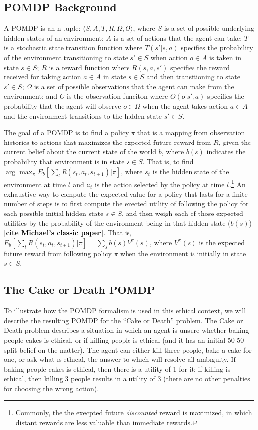 \documentclass[11pt]{article}
\newcommand\ncitea[1]{\textcolor{black}{{\bf [cite #1]}}}
\begin{document}
\subsection{POMDP Background}
A POMDP is an n tuple: $\langle S,A,T,R,\Omega,O \rangle$, where $S$ is a set of possible underlying hidden states of an environment; $A$ is a set of actions that the agent can take; $T$ is a stochastic state transition function where $T(s' | s, a)$ specifies the probability of the environment transitioning to state $s' \in S$ when action $a \in A$ is taken in state $s \in S$; $R$ is a reward function where $R(s, a, s')$ specifies the reward received for taking action $a \in A$ in state $s \in S$ and then transitioning to state $s' \in S$; $\Omega$ is a set of possible observations that the agent can make from the environment; and $O$ is the observation funciton where $O(o | s', a)$ specifies the probability that the agent will observe $o \in \Omega$ when the agent takes action $a \in A$ and the environment transitions to the hidden state $s' \in S$.

The goal of a POMDP is to find a policy $\pi$ that is a mapping from observation histories to actions that maximizes the expected future reward from $R$, given the current belief about the current state of the world $b$, where $b(s)$ indicates the probability that environment is in state $s \in S$. That is, to find $\arg\max_\pi E_b[\sum_t R(s_t,a_t,s_{t+1}) | \pi]$, where $s_t$ is the hidden state of the environment at time $t$ and $a_t$ is the action selected by the policy at time $t$.\footnote{Commonly, the the execpted future {\em discounted} reward is maximized, in which distant rewards are less valuable than immediate rewards.} An exhaustive way to compute the expected value for a policy that lasts for a finite number of steps is to first compute the exected utility of following the policy for each possible initial hidden state $s \in S$, and then weigh each of those expected utilities by the probability of the environment being in that hidden state ($b(s)$) \ncitea{Michael's classic paper}. That is, $E_b[\sum_t R(s_t,a_t,s_{t+1}) | \pi] = \sum_s b(s) V^\pi(s)$, where $V^\pi(s)$ is the expected future reward from following policy $\pi$ when the environment is initially in state $s \in S$.

\subsection{The Cake or Death POMDP}
To illustrate how the POMDP formalism is used in this ethical context, we will describe the resulting POMDP for the ``Cake or Death'' problem. The Cake or Death problem describes a situation in which an agent is unsure whether baking people cakes is ethical, or if killing people is ethical (and it has an initial 50-50 split belief on the matter). The agent can either kill three people, bake a cake for one, or ask what is ethical, the answer to which will resolve all ambiguity. If baking people cakes is ethical, then there is a utility of 1 for it; if killing is ethical, then killing 3 people results in a utility of 3 (there are no other penalties for choosing the wrong action). 
\end{document}
